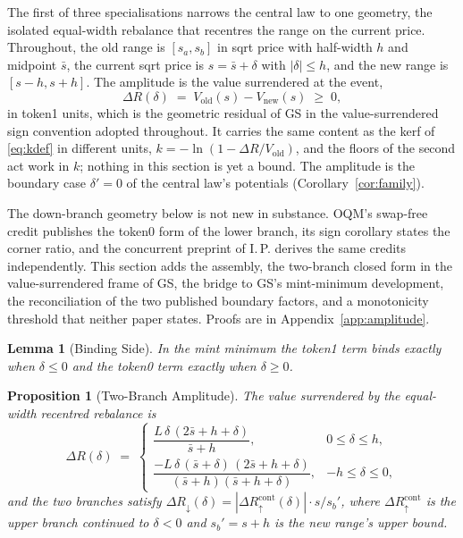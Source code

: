 \documentclass[11pt,a4paper]{article}
\theoremstyle{definition}
\theoremstyle{plain}
\newtheorem{proposition}{Proposition}
\newtheorem{lemma}{Lemma}
\theoremstyle{remark}
\begin{document}
The first of three specialisations narrows the central law to one geometry, the isolated equal-width rebalance that recentres the range on the current price. Throughout, 
the old range is $[s_a, s_b]$ in sqrt price with half-width $h$ and midpoint $\bar s$, the current sqrt price is $s = \bar s + \delta$ with $|\delta| \le h$, and the new range 
is $[s - h, s + h]$. The amplitude is the value surrendered at the event,
\[
\Delta R(\delta) \;=\; V_{\mathrm{old}}(s) - V_{\mathrm{new}}(s)
\;\ge\; 0 ,
\]
in token1 units, which is the geometric residual of GS in the value-surrendered sign convention adopted throughout. It carries the same content as the kerf of \eqref{eq:kdef} in 
different units, $k = -\ln(1 - \Delta R / V_{\mathrm{old}})$, and the floors of the second act work in $k$; nothing in this section is yet a bound. The amplitude is the boundary 
case $\delta' = 0$ of the central law's potentials (Corollary~\ref{cor:family}).

The down-branch geometry below is not new in substance. OQM's swap-free credit publishes the token0 form of the lower branch, its sign corollary states the corner ratio, and the 
concurrent preprint of I.\,P.\cite{pi2026convexity} derives the same credits independently. This section adds the assembly, the two-branch closed form in the value-surrendered 
frame of GS, the bridge to GS's mint-minimum development, the reconciliation of the two published boundary factors, and a monotonicity threshold that neither paper states. 
Proofs are in Appendix~\ref{app:amplitude}.

\begin{lemma}[Binding Side]\label{lem:binding}
In the mint minimum the token1 term binds exactly when $\delta \le 0$ and the token0 term exactly when $\delta \ge 0$.
\end{lemma}

\begin{proposition}[Two-Branch Amplitude]\label{prop:amplitude}
The value surrendered by the equal-width recentred rebalance is
\begin{equation}\label{eq:branches}
\Delta R(\delta) \;=\;
\begin{cases}
\dfrac{L\,\delta\,(2\bar s + h + \delta)}{\bar s + h},
& 0 \le \delta \le h,\\[10pt]
\dfrac{-L\,\delta\,(\bar s + \delta)\,(2\bar s + h + \delta)}
{(\bar s + h)(\bar s + h + \delta)},
& -h \le \delta \le 0,
\end{cases}
\end{equation}
and the two branches satisfy $\Delta R_{\downarrow}(\delta) =
|\Delta R_{\uparrow}^{\mathrm{cont}}(\delta)| \cdot s / s_b'$, where $\Delta R_{\uparrow}^{\mathrm{cont}}$ is the upper branch continued to $\delta < 0$ and $s_b' = s + h$ is the new range's upper bound.
\end{proposition}
\end{document}
